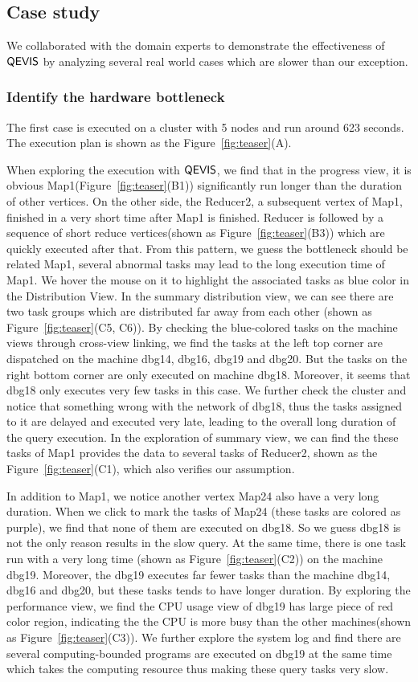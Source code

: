 \subsection{Case study}
We collaborated with the domain experts to demonstrate the effectiveness of $\mathsf{QEVIS}$ by analyzing several real world cases which are slower than our exception.

\subsubsection{Identify the hardware bottleneck}
The first case is executed on a cluster with 5 nodes and run around 623 seconds. The execution plan is shown as the Figure~\ref{fig:teaser}(A).

When exploring the execution with $\mathsf{QEVIS}$, we find that in the progress view, it is obvious Map1(Figure~\ref{fig:teaser}(B1)) significantly run longer than the duration of other vertices. On the other side, the Reducer2, a subsequent vertex of Map1, finished in a very short time after Map1 is finished. Reducer is followed by a sequence of short reduce vertices(shown as Figure~\ref{fig:teaser}(B3)) which are quickly executed after that. 
From this pattern, we guess the bottleneck should be related Map1, several abnormal tasks may lead to the long execution time of Map1. We hover the mouse on it to highlight the associated tasks as blue color in the Distribution View.
In the summary distribution view, we can see there are two task groups which are distributed far away from each other (shown as Figure~\ref{fig:teaser}(C5, C6)). 
By checking the blue-colored tasks on the machine views through cross-view linking, we find the tasks at the left top corner are dispatched on the machine dbg14, dbg16, dbg19 and dbg20. But the tasks on the right bottom corner are only executed on machine dbg18. Moreover, it seems that dbg18 only executes very few tasks in this case. 
We further check the cluster and notice that something wrong with the network of dbg18, thus the tasks assigned to it are delayed and executed very late, leading to the overall long duration of the query execution. In the exploration of summary view, we can find the these tasks of Map1 provides the data to several tasks of Reducer2, shown as the Figure~\ref{fig:teaser}(C1), which also verifies our assumption. 

In addition to Map1, we notice another vertex Map24 also have a very long duration. When we click to mark the tasks of Map24 (these tasks are colored as purple), we find that none of them are executed on dbg18. So we guess dbg18 is not the only reason results in the slow query. At the same time, there is one task run with a very long time (shown as Figure~\ref{fig:teaser}(C2)) on the machine dbg19. Moreover, the dbg19 executes far fewer tasks than the machine dbg14, dbg16 and dbg20, but these tasks tends to have longer duration. By exploring the performance view, we find the CPU usage view of dbg19 has large piece of red color region, indicating the the CPU is more busy than the other machines(shown as Figure~\ref{fig:teaser}(C3)). We further explore the system log and find there are several computing-bounded programs are executed on dbg19 at the same time which takes the computing resource thus making these query tasks very slow.


